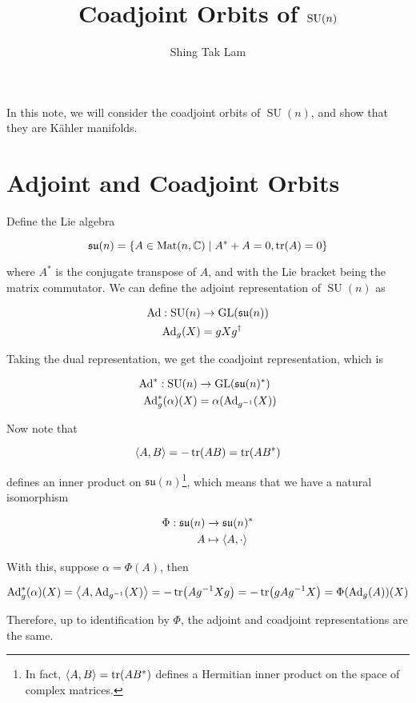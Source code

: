 \documentclass{article}
\title{Coadjoint Orbits of \(\SU(n)\)}
\author{Shing Tak Lam}
\DeclareMathOperator{\SU}{SU}
\newcommand{\su}{\mathfrak{su}}
\begin{document}
\maketitle

In this note, we will consider the coadjoint orbits of \(\SU(n)\), and show that they are K\"ahler manifolds.

\tableofcontents

\section{Adjoint and Coadjoint Orbits}

Define the Lie algebra

\[\su(n) = \left\{A \in \Mat(n, \C) \mid A^* + A = 0, \tr(A) = 0\right\}\]

where \(A^*\) is the conjugate transpose of \(A\), and with the Lie bracket being the matrix commutator. We can define the adjoint representation of \(\SU(n)\) as

\begin{align*}
    \Ad : \SU(n) &\to \GL(\su(n)) \\
    \Ad_g(X) &= gXg^\dagger
\end{align*}

Taking the dual representation, we get the coadjoint representation, which is

\begin{align*}
    \Ad^* : \SU(n) &\to \GL(\su(n)^*) \\
    \Ad^*_g(\alpha)(X) &= \alpha(\Ad_{g^{-1}}(X))
\end{align*}

Now note that

\[\left\langle A, B \right\rangle = -\tr(AB) = \tr(AB^*)\]

defines an inner product on \(\su(n)\)\footnote{In fact, \(\left\langle A, B \right\rangle = \tr(AB^*)\) defines a Hermitian inner product on the space of complex matrices.}, which means that we have a natural isomorphism

\begin{align*}
    \Phi : \su(n) &\to \su(n)^* \\
    A &\mapsto \inner{A, \cdot}
\end{align*}

With this, suppose \(\alpha = \Phi(A)\), then

\[\operatorname{Ad}_g^*(\alpha)(X) = \left\langle A, \operatorname{Ad}_{g^{-1}}(X) \right\rangle = -\tr(Ag^{-1}Xg) = -\tr(gAg^{-1}X) = \Phi(\operatorname{Ad}_g(A))(X)\]

Therefore, up to identification by \(\Phi\), the adjoint and coadjoint representations are the same.
\end{document}
